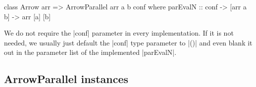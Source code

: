 \begin{code}
class Arrow arr => ArrowParallel arr a b conf where
	parEvalN :: conf -> [arr a b] -> arr [a] [b]
\end{code}
We do not require the |conf| parameter in every implementation. If it is not needed, we usually just default the |conf| type parameter to |()| and even blank it out in the parameter list of the implemented |parEvalN|.

\subsection{ArrowParallel instances}

